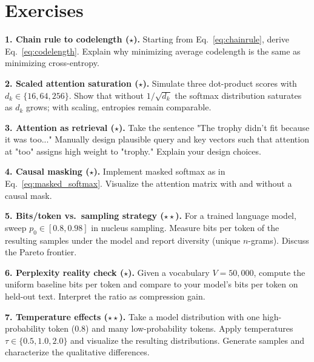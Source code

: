\section*{Exercises}

\textbf{1. Chain rule to codelength ($\star$).} Starting from Eq.~\eqref{eq:chainrule}, derive Eq.~\eqref{eq:codelength}. Explain why minimizing average codelength is the same as minimizing cross-entropy.

\vspace{0.3cm}

\textbf{2. Scaled attention saturation ($\star$).} Simulate three dot-product scores with $d_k\in\{16,64,256\}$. Show that without $1/\sqrt{d_k}$ the softmax distribution saturates as $d_k$ grows; with scaling, entropies remain comparable.

\vspace{0.3cm}

\textbf{3. Attention as retrieval ($\star$).} Take the sentence "The trophy didn't fit because it was too..." Manually design plausible query and key vectors such that attention at "too" assigns high weight to "trophy." Explain your design choices.

\vspace{0.3cm}

\textbf{4. Causal masking ($\star$).} Implement masked softmax as in Eq.~\eqref{eq:masked_softmax}. Visualize the attention matrix with and without a causal mask.

\vspace{0.3cm}

\textbf{5. Bits/token vs.\ sampling strategy ($\star\star$).} For a trained language model, sweep $p_0\in[0.8,0.98]$ in nucleus sampling. Measure bits per token of the resulting samples under the model and report diversity (unique $n$-grams). Discuss the Pareto frontier.

\vspace{0.3cm}

\textbf{6. Perplexity reality check ($\star$).} Given a vocabulary $V=50{,}000$, compute the uniform baseline bits per token and compare to your model's bits per token on held-out text. Interpret the ratio as compression gain.

\vspace{0.3cm}

\textbf{7. Temperature effects ($\star\star$).} Take a model distribution with one high-probability token (0.8) and many low-probability tokens. Apply temperatures $\tau \in \{0.5, 1.0, 2.0\}$ and visualize the resulting distributions. Generate samples and characterize the qualitative differences.

